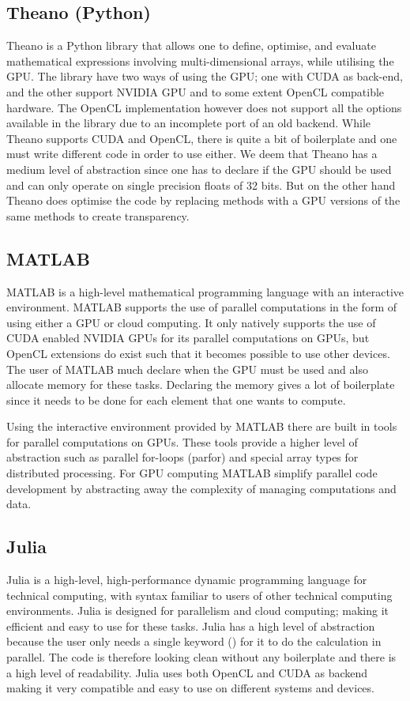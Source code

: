 \subsection{Theano (Python)}
Theano is a Python library that allows one to define, optimise, and evaluate mathematical expressions involving multi-dimensional arrays, while utilising the GPU.
The library have two ways of using the GPU; one with CUDA as back-end, and the other support NVIDIA GPU and to some extent OpenCL compatible hardware.
The OpenCL implementation however does not support all the options available in the library due to an incomplete port of an old backend.
While Theano supports CUDA and OpenCL, there is quite a bit of boilerplate and one must write different code in order to use either.
We deem that Theano has a medium level of abstraction since one has to declare if the GPU should be used and can only operate on single precision floats of 32 bits.
But on the other hand Theano does optimise the code by replacing methods with a GPU versions of the same methods to create transparency.\citep{Theano,Theano_GPU}

\subsection{MATLAB}
MATLAB is a high-level mathematical programming language with an interactive environment.
MATLAB supports the use of parallel computations in the form of using either a GPU or cloud computing.
It only natively supports the use of CUDA enabled NVIDIA GPUs for its parallel computations on GPUs, but OpenCL extensions do exist such that it becomes possible to use other devices.
The user of MATLAB much declare when the GPU must be used and also allocate memory for these tasks.
Declaring the memory gives a lot of boilerplate since it needs to be done for each element that one wants to compute.\citep{MATLAB_backend,MATLAB_benchmark,}

Using the interactive environment provided by MATLAB there are built in tools for parallel computations on GPUs.
These tools provide a higher level of abstraction such as parallel for-loops (parfor) and special array types for distributed processing.
For GPU computing MATLAB simplify parallel code development by abstracting away the complexity of managing computations and data.\citep{MATLAB_parallel}

\subsection{Julia}
Julia is a high-level, high-performance dynamic programming language for technical computing, with syntax familiar to users of other technical computing environments.
Julia is designed for parallelism and cloud computing; making it efficient and easy to use for these tasks.
Julia has a high level of abstraction because the user only needs a single keyword (\@parallel) for it to do the calculation in parallel.
The code is therefore looking clean without any boilerplate and there is a high level of readability.
Julia uses both OpenCL and CUDA as backend making it very compatible and easy to use on different systems and devices.\citep{Julia_Git,Julia}

